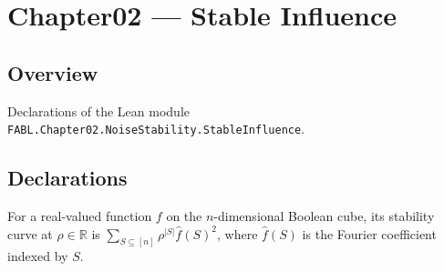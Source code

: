 \chapter{Chapter02 — Stable Influence}
\section{Overview}

Declarations of the Lean module \texttt{FABL.Chapter02.NoiseStability.StableInfluence}.

\section{Declarations}

\begin{definition}
\label{FABL.stabilityCurve}
\leanok
{}
For a real-valued function $f$ on the $n$-dimensional Boolean cube, its stability curve
at $\rho\in\mathbb{R}$ is $\sum_{S\subseteq[n]}\rho^{|S|}\widehat f(S)^2$, where
$\widehat f(S)$ is the Fourier coefficient indexed by $S$.
\end{definition}

